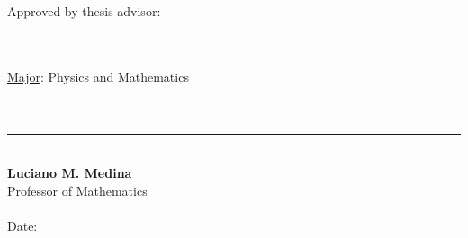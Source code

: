 \documentclass[12pt]{report}
\theoremstyle{definition}
\begin{document}
\begin{tabbing}
    Approved by thesis advisor:

    \hspace*{.50in} \=  \\

    \> \\

    \underline{Major}: Physics and Mathematics \\

    \> \\
    \> \\

    \> \rule[0.0in]{2.5in}{0.01in} \\

    \> \textbf{Luciano M. Medina} \\

    \> Professor of Mathematics \\

    \> \\

    \>  Date: \underline{\hspace{2in}} \\
\end{tabbing}
\end{document}

